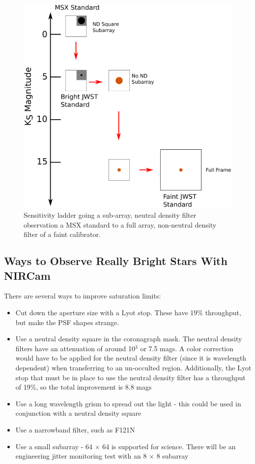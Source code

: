 \documentclass{aastex6}
\begin{document}
\begin{figure}[!hbtp]
\centering
\includegraphics[width=.6\columnwidth]{flux_ladder.pdf}
\caption{Sensitivity ladder going a sub-array, neutral density filter observation a MSX standard to a full array, non-neutral density filter of a faint calibrator.}\label{fig:sensitityLadder}
\end{figure}

\subsection{Ways to Observe Really Bright Stars With NIRCam}

There are several ways to improve saturation limits:
\begin{itemize}
\item Cut down the aperture size with a Lyot stop. These have 19\% throughput, but make the PSF shapes strange.
\item Use a neutral density square in the coronagraph mask. The neutral density filters have an attenuation of around 10$^3$ or 7.5 mags. A color correction would have to be applied for the neutral density filter (since it is wavelength dependent) when transferring to an un-occulted region. Additionally, the Lyot stop that must be in place to use the neutral density filter has a throughput of 19\%, so the total improvement is 8.8 mags
\item Use a long wavelength grism to spread out the light - this could be used in conjunction with a neutral density square
\item Use a narrowband filter, such as F121N
\item Use a small subarray - 64 $\times$ 64 is supported for science. There will be an engineering jitter monitoring test with an 8 $\times$ 8 subarray 
\end{itemize}
\end{document}
